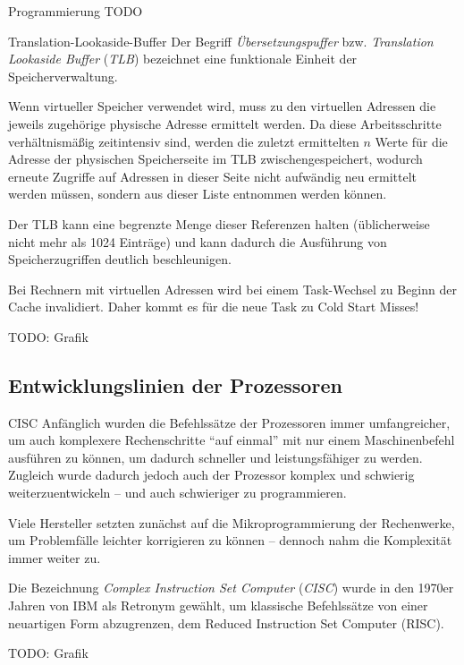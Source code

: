 \begin{example}{Programmierung}
    TODO
\end{example}

\begin{defi}{Translation-Lookaside-Buffer}
    Der Begriff \emph{Übersetzungspuffer} bzw. \emph{Translation Lookaside Buffer} (\emph{TLB}) bezeichnet eine funktionale Einheit der Speicherverwaltung.

    Wenn virtueller Speicher verwendet wird, muss zu den virtuellen Adressen die jeweils zugehörige physische Adresse ermittelt werden.
    Da diese Arbeitsschritte verhältnismäßig zeitintensiv sind, werden die zuletzt ermittelten $n$ Werte für die Adresse der physischen Speicherseite im TLB zwischengespeichert, wodurch erneute Zugriffe auf Adressen in dieser Seite nicht aufwändig neu ermittelt werden müssen, sondern aus dieser Liste entnommen werden können.

    Der TLB kann eine begrenzte Menge dieser Referenzen halten (üblicherweise nicht mehr als 1024 Einträge) und kann dadurch die Ausführung von Speicherzugriffen deutlich beschleunigen.

    Bei Rechnern mit virtuellen Adressen wird bei einem Task-Wechsel zu Beginn der Cache invalidiert.
    Daher kommt es für die neue Task zu Cold Start Misses!

    TODO: Grafik
\end{defi}

\subsection{Entwicklungslinien der Prozessoren}

\begin{defi}[Befehlssatzarchitektur]{CISC}
    Anfänglich wurden die Befehlssätze der Prozessoren immer umfangreicher, um auch komplexere Rechenschritte \enquote{auf einmal} mit nur einem Maschinenbefehl ausführen zu können, um dadurch schneller und leistungsfähiger zu werden.
    Zugleich wurde dadurch jedoch auch der Prozessor komplex und schwierig weiterzuentwickeln -- und auch schwieriger zu programmieren.

    Viele Hersteller setzten zunächst auf die Mikroprogrammierung der Rechenwerke, um Problemfälle leichter korrigieren zu können -- dennoch nahm die Komplexität immer weiter zu.

    Die Bezeichnung \emph{Complex Instruction Set Computer} (\emph{CISC}) wurde in den 1970er Jahren von IBM als Retronym gewählt, um klassische Befehlssätze von einer neuartigen Form abzugrenzen, dem Reduced Instruction Set Computer (RISC).

    TODO: Grafik
\end{defi}

